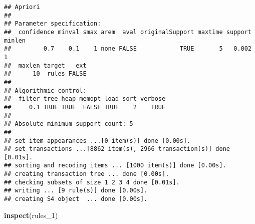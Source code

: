 \documentclass[]{article}
\newenvironment{Shaded}{\begin{snugshade}}{\end{snugshade}}
\newcommand{\DecValTok}[1]{\textcolor[rgb]{0.00,0.00,0.81}{#1}}
\newcommand{\KeywordTok}[1]{\textcolor[rgb]{0.13,0.29,0.53}{\textbf{#1}}}
\newcommand{\NormalTok}[1]{#1}
\begin{document}
\begin{verbatim}
## Apriori
## 
## Parameter specification:
##  confidence minval smax arem  aval originalSupport maxtime support minlen
##         0.7    0.1    1 none FALSE            TRUE       5   0.002      1
##  maxlen target   ext
##      10  rules FALSE
## 
## Algorithmic control:
##  filter tree heap memopt load sort verbose
##     0.1 TRUE TRUE  FALSE TRUE    2    TRUE
## 
## Absolute minimum support count: 5 
## 
## set item appearances ...[0 item(s)] done [0.00s].
## set transactions ...[8862 item(s), 2966 transaction(s)] done [0.01s].
## sorting and recoding items ... [1000 item(s)] done [0.00s].
## creating transaction tree ... done [0.00s].
## checking subsets of size 1 2 3 4 done [0.01s].
## writing ... [9 rule(s)] done [0.00s].
## creating S4 object  ... done [0.00s].
\end{verbatim}

\begin{Shaded}
\begin{Highlighting}[]
\KeywordTok{inspect}\NormalTok{(rules_}\DecValTok{1}\NormalTok{)}
\end{Highlighting}
\end{Shaded}
\end{document}
